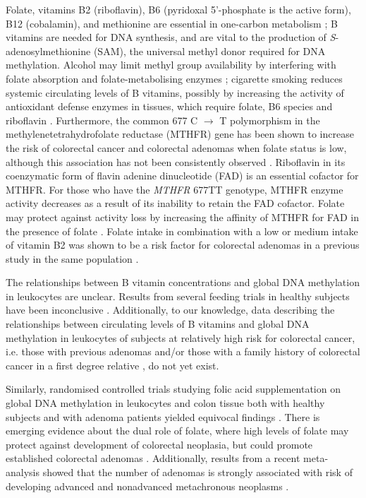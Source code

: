 \noindent Folate, vitamins B2 (riboflavin), B6 (pyridoxal 5'-phosphate is the active form), B12 (cobalamin), and methionine are essential in one-carbon metabolism \cite{c515}; B vitamins are needed for DNA synthesis, and are vital to the production of \emph{S}-adenosylmethionine (SAM), the universal methyl donor required for DNA methylation. Alcohol may limit methyl group availability by interfering with folate absorption and folate-metabolising enzymes \cite{c516}; cigarette smoking reduces systemic circulating levels of B vitamins, possibly by increasing the activity of antioxidant defense enzymes in tissues, which require folate, B6 species and riboflavin \cite{c517}. Furthermore, the common 677 C $\rightarrow$ T polymorphism in the methylenetetrahydrofolate reductase (MTHFR) gene has been shown to increase the risk of colorectal cancer \cite{c518} and colorectal adenomas \cite{c519} when folate status is low, although this association has not been consistently observed \cite{c520,c521,c522}. Riboflavin 
in its coenzymatic form of flavin adenine dinucleotide (FAD) is an essential cofactor for MTHFR. For those who have the \emph{MTHFR} 677TT genotype, MTHFR enzyme activity decreases as a result of its inability to retain the FAD cofactor. Folate may protect against activity loss by increasing the affinity of MTHFR for FAD in the presence of folate \cite{c523, c524}. Folate intake in combination with a low or medium intake of vitamin B2 was shown to be a risk factor for colorectal adenomas in a previous study in the same population \cite{c525}.

\noindent The relationships between B vitamin concentrations and global DNA methylation in leukocytes are unclear. Results from several feeding trials in healthy subjects have been inconclusive \cite{c526,c527,c528,c529}. Additionally, to our knowledge, data describing the relationships between circulating levels of B vitamins and global DNA methylation in leukocytes of subjects at relatively high risk for colorectal cancer, i.e. those with previous adenomas \cite{c530,c531} and/or those with a family history of colorectal cancer in a first degree relative \cite{c532}, do not yet exist.

\noindent Similarly, randomised controlled trials studying folic acid supplementation on global DNA methylation in leukocytes and colon tissue both with healthy subjects and with adenoma patients yielded equivocal findings \cite{c533,c534,c535,c536,c537,c538,c539,c540}. There is emerging evidence about the dual role of folate, where high levels of folate may protect against development of colorectal neoplasia, but could promote established colorectal adenomas \cite{c541,c542}. Additionally, results from a recent meta-analysis showed that the number of adenomas is strongly associated with risk of developing advanced and nonadvanced metachronous neoplasms \cite{c531}.

